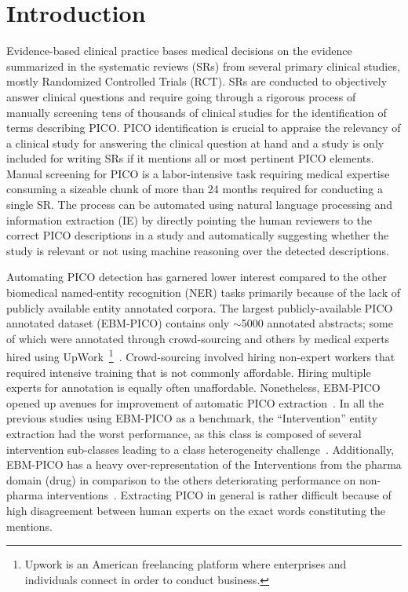 \documentclass[letterpaper]{article} %
\begin{document}
\section{Introduction}
\label{sec:intro}
%
Evidence-based clinical practice bases medical decisions on the evidence summarized in the systematic reviews (SRs) from several primary clinical studies, mostly Randomized Controlled Trials (RCT).
SRs are conducted to objectively answer clinical questions and require going through a rigorous process of manually screening tens of thousands of clinical studies for the identification of terms describing PICO.
PICO identification is crucial to appraise the relevancy of a clinical study for answering the clinical question at hand and a study is only included for writing SRs if it mentions all or most pertinent PICO elements.
Manual screening for PICO is a labor-intensive task requiring medical expertise consuming a sizeable chunk of more than 24 months required for conducting a single SR.
The process can be automated using natural language processing and information extraction (IE) by directly pointing the human reviewers to the correct PICO descriptions in a study and automatically suggesting whether the study is relevant or not using machine reasoning over the detected descriptions.

Automating PICO detection has garnered lower interest compared to the other biomedical named-entity recognition (NER) tasks primarily because of the lack of publicly available entity annotated corpora.
The largest publicly-available PICO annotated dataset (EBM-PICO) contains only $\sim$5000 annotated abstracts; some of which were annotated through crowd-sourcing and others by medical experts hired using UpWork~\footnote{Upwork is an American freelancing platform where enterprises and individuals connect in order to conduct business.}~\cite{nye2018corpus}.
Crowd-sourcing involved hiring non-expert workers that required intensive training that is not commonly affordable.
Hiring multiple experts for annotation is equally often unaffordable.
Nonetheless, EBM-PICO opened up avenues for improvement of automatic PICO extraction~\cite{gu2020domain}.
In all the previous studies using EBM-PICO as a benchmark, the ``Intervention'' entity extraction had the worst performance, as this class is composed of several intervention sub-classes leading to a class heterogeneity challenge~\cite{jaseena2014issues, cardellino2017low}.
Additionally, EBM-PICO has a heavy over-representation of the Interventions from the pharma domain (drug) in comparison to the others deteriorating performance on non-pharma interventions~\cite{dhrangadhariya2021multipico}.
Extracting PICO in general is rather difficult because of high disagreement between human experts on the exact words constituting the mentions.
\end{document}
